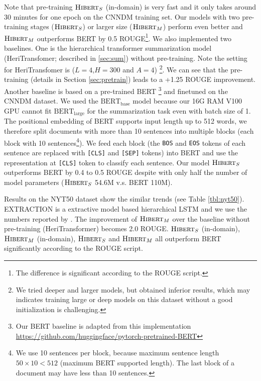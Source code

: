 \documentclass[11pt,a4paper]{article}
\begin{document}
Note that pre-training $\text{\sc Hibert}_S$ (in-domain) is very fast and it only takes around 30 minutes for one epoch on the CNNDM training set. Our models with two pre-training stages ($\text{\sc Hibert}_S$) or larger size ($\text{\sc Hibert}_M$) perform even better and $\text{\sc Hibert}_M$ outperforms BERT by 0.5 ROUGE\footnote{The difference is significant according to the ROUGE script.}. We also implemented two baselines. One is the hierarchical transformer summarization model (HeriTransfomer; described in \ref{sec:sum}) without pre-training. Note the setting for HeriTransfomer is ($L=4$,$H=300$ and $A=4$) \footnote{We tried deeper and larger models, but obtained inferior results, which may indicates training large or deep models on this dataset without a good initialization is challenging.}. We can see that the pre-training (details in Section \ref{sec:pretrain}) leads to a +1.25 ROUGE improvement. Another baseline is based on a pre-trained BERT \cite{devlin:2018:arxiv}\footnote{Our BERT baseline is adapted from this implementation \url{https://github.com/huggingface/pytorch-pretrained-BERT}} and finetuned on the CNNDM dataset. We used the $\text{BERT}_{\text{base}}$ model because our 16G RAM V100 GPU cannot fit $\text{BERT}_{\text{large}}$ for the summarization task even with batch size of 1. The positional embedding of BERT supports input length up to 512 words, we therefore split documents with more than 10 sentences into multiple blocks (each block with 10 sentences\footnote{We use 10 sentences per block, because maximum sentence length $50 \times 10 < 512$ (maximum BERT supported length). The last block of a document may have less than 10 sentences.}). We feed each block (the {\tt BOS} and {\tt EOS} tokens of each sentence are replaced with {\tt [CLS]} and {\tt [SEP]} tokens) into BERT and use the representation at {\tt [CLS]} token to classify each sentence. Our model $\text{\sc Hibert}_S$ outperforms BERT by 0.4 to 0.5 ROUGE despite with only half the number of model parameters ($\text{\sc Hibert}_S$ 54.6M v.s. BERT 110M). 

Results on the NYT50 dataset show the similar trends (see Table \ref{tbl:nyt50}). EXTRACTION is a extractive model based hierarchical LSTM and we use the numbers reported by . The improvement of $\text{\sc Hibert}_M$ over the baseline without pre-training (HeriTransformer) becomes 2.0 ROUGE. $\text{\sc Hibert}_S$ (in-domain), $\text{\sc Hibert}_M$ (in-domain), $\text{\sc Hibert}_S$ and $\text{\sc Hibert}_M$ all outperform BERT significantly according to the ROUGE script.
\end{document}

